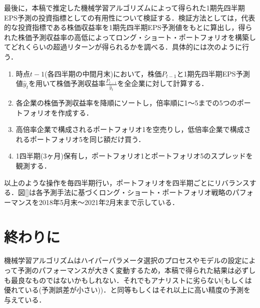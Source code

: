 \documentclass[a4paper，12pt]{jsarticle}
\begin{document}
最後に，本稿で推定した機械学習アルゴリズムによって得られた1期先四半期EPS予測の投資指標としての有用性について検証する．検証方法としては，代表的な投資指標である株価収益率を1期先四半期EPS予測値をもとに算出し，得られた株価予測収益率の高低によってロング・ショート・ポートフォリオを構築してどれくらいの超過リターンが得られるかを調べる．具体的には次のように行う．

\begin{enumerate}
  \item 時点$t-1$(各四半期の中間月末)において，株価$P_{t-1}$と1期先四半期EPS予測値$\hat{y}_t$を用いて株価予測収益率$\frac{P_{t-1}}{\hat{y}_t}$を全企業に対して計算する．
  \item 各企業の株価予測収益率を降順にソートし，倍率順に1～5までの5つのポートフォリオを作成する．
  \item 高倍率企業で構成されるポートフォリオ1を空売りし，低倍率企業で構成されるポートフォリオ5を同じ額だけ買う．
  \item 1四半期(3ヶ月)保有し，ポートフォリオ1とポートフォリオ5のスプレッドを観測する．
\end{enumerate}

以上のような操作を毎四半期行い，ポートフォリオを四半期ごとにリバランスする．図\ref{}は各予測手法に基づくロング・ショート・ポートフォリオ戦略のパフォーマンスを2018年5月末～2021年2月末まで示している．


\part{終わりに} \label{par:conclusion}



機械学習アルゴリズムはハイパーパラメータ選択のプロセスやモデルの設定によって予測のパフォーマンスが大きく変動するため，本稿で得られた結果は必ずしも最良なものではないかもしれない．それでもアナリストに劣らない(もしくは優れている(予測誤差が小さい))．と同等もしくはそれ以上に高い精度の予測を与えている．
\end{document}
